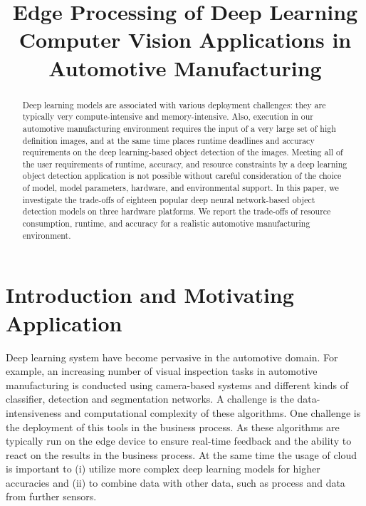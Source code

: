 \documentclass[conference]{IEEEtran}
\begin{document}
\title{Edge Processing of Deep Learning Computer Vision Applications in  Automotive Manufacturing}


\maketitle

\thispagestyle{plain}
\pagestyle{plain}



\begin{abstract}
Deep learning models are associated with various deployment challenges: they are typically very compute-intensive and memory-intensive.
Also, execution in our automotive manufacturing environment requires the input of a very large set of high definition images, and at the same time places runtime deadlines and accuracy requirements on the deep learning-based object detection of the images.
Meeting all of the user requirements of runtime, accuracy, and resource constraints by a deep learning object detection application is not possible without careful consideration of the choice of model, model parameters, hardware, and environmental support.
In this paper, we investigate the trade-offs of eighteen popular deep  neural network-based  object detection models on three hardware platforms.  
We report the trade-offs of resource consumption, runtime, and accuracy for a realistic automotive manufacturing environment.
\end{abstract}


\IEEEpeerreviewmaketitle

\nocite{*}

\section{Introduction and Motivating Application}

Deep learning system have become pervasive in the automotive domain. For example, an increasing number of visual inspection tasks in automotive manufacturing is conducted using camera-based systems and different kinds of classifier, detection and segmentation networks. A challenge is the data-intensiveness and computational complexity of these algorithms. One challenge is the deployment of this tools in the business process. As these algorithms are typically run on the edge device to ensure real-time feedback and the ability to react on the results in the business process. At the same time the usage of cloud is important to (i) utilize more complex deep learning models for higher accuracies and (ii) to combine data with other data, such as process and data from further sensors.
\end{document}
